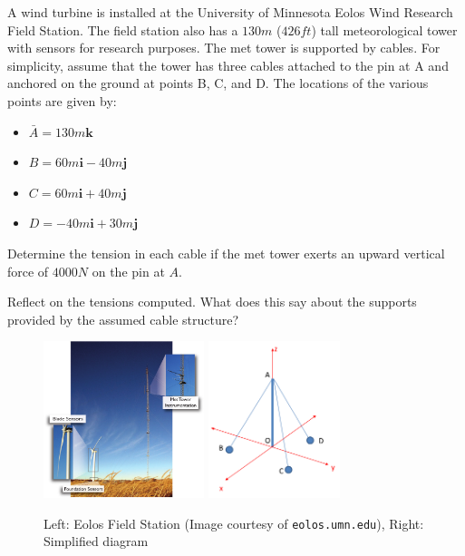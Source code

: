 
A wind turbine is installed at the University of Minnesota Eolos Wind Research Field Station. The field station also has a $130 m$ ($426 ft$) tall meteorological tower with sensors for research purposes. The met tower is supported by cables. For simplicity, assume that the tower has three cables attached to the pin at A and anchored on the ground at points B, C, and D. The locations of the various points are given by:
\begin{itemize}
  \item $\bar{A} = 130m \textbf{k}$
  \item $B = 60m \textbf{i} - 40m \textbf{j}$
  \item $C = 60m \textbf{i} + 40m \textbf{j}$
  \item $D = - 40m \textbf{i} + 30m \textbf{j}$
\end{itemize}  
Determine the tension in each cable if the met tower exerts an upward vertical force of $4000 N$ on the pin at $A$.

Reflect on the tensions computed.  What does this say about the supports provided by the assumed cable structure?

\begin{figure}[ht!]
  \centering
  \includegraphics[height=1.8in]{figa.png}
  \includegraphics[height=1.8in]{figb.png}
  \caption*{Left: Eolos Field Station (Image courtesy of \texttt{eolos.umn.edu}), Right: Simplified diagram}
\end{figure}

